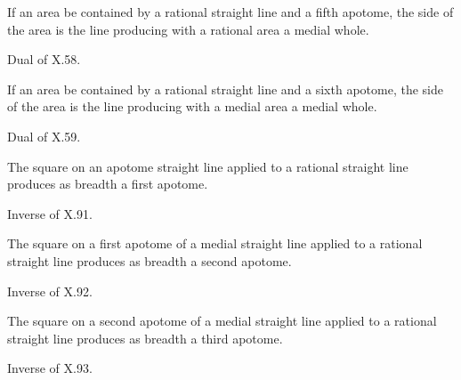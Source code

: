 \begin{claim}
\label{prop:X.95}
If an area be contained by a rational straight line and a fifth
apotome, the side of the area is the line producing with a rational
area a medial whole.
\end{claim}
\begin{evidence}[Proof of X.95]
\label{ev:X.95}
Dual of X.58.
\end{evidence}

\begin{claim}
\label{prop:X.96}
If an area be contained by a rational straight line and a sixth
apotome, the side of the area is the line producing with a medial
area a medial whole.
\end{claim}
\begin{evidence}[Proof of X.96]
\label{ev:X.96}
Dual of X.59.
\end{evidence}

\begin{claim}
\label{prop:X.97}
The square on an apotome straight line applied to a rational
straight line produces as breadth a first apotome.
\end{claim}
\begin{evidence}[Proof of X.97]
\label{ev:X.97}
Inverse of X.91.
\end{evidence}

\begin{claim}
\label{prop:X.98}
The square on a first apotome of a medial straight line applied to
a rational straight line produces as breadth a second apotome.
\end{claim}
\begin{evidence}[Proof of X.98]
\label{ev:X.98}
Inverse of X.92.
\end{evidence}

\begin{claim}
\label{prop:X.99}
The square on a second apotome of a medial straight line applied to
a rational straight line produces as breadth a third apotome.
\end{claim}
\begin{evidence}[Proof of X.99]
\label{ev:X.99}
Inverse of X.93.
\end{evidence}

